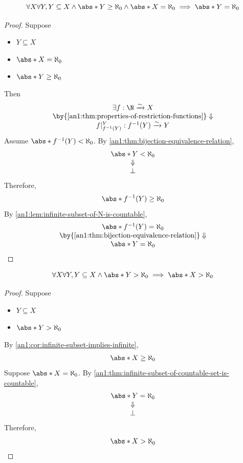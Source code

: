 \begin{theorem} \label{an1:thm:infinite-subset-of-countable-set-is-countable}
  \[
    \forall X \forall Y, Y \subseteq X \land \abs*{Y} \geq \aleph_{0} \land \abs*{X} = \aleph_{0}
    \implies \abs*{Y} = \aleph_{0}
  \]
\end{theorem}

\begin{proof}
  Suppose
  \begin{itemize}
    \item $Y \subseteq X$
    \item $\abs*{X} = \aleph_{0}$
    \item $\abs*{Y} \geq \aleph_{0}$
  \end{itemize}
  Then
  \[
    \begin{array}{c}
      \exists f: \N \xrightarrow{\sim} X                                 \\
      \by{\Cref{an1:thm:properties-of-restriction-functions}} \Downarrow \\
      f|_{f^{-1}(Y)}^{Y}: f^{-1}(Y) \xrightarrow{\sim} Y
    \end{array}
  \]
  Assume $\abs*{f^{-1}(Y)} < \aleph_{0}$. By \cref{an1:thm:bijection-equivalence-relation},
  \[
    \begin{array}{c}
      \abs*{Y} < \aleph_{0} \\
      \Downarrow            \\
      \bot
    \end{array}
  \]
  Therefore,
  \[
    \abs*{f^{-1}(Y)} \geq \aleph_{0}
  \]
  By \cref{an1:lem:infinite-subset-of-N-is-countable},
  \[
    \begin{array}{c}
      \abs*{f^{-1}(Y)} = \aleph_{0}                                 \\
      \by{\Cref{an1:thm:bijection-equivalence-relation}} \Downarrow \\
      \abs*{Y} = \aleph_{0}
    \end{array}
  \]
\end{proof}

\begin{corollary} \label{an1:cor:uncountable-subset-implies-uncountable}
  \[
    \forall X \forall Y, Y \subseteq X \land \abs*{Y} > \aleph_{0} \implies \abs*{X} > \aleph_{0}
  \]
\end{corollary}

\begin{proof}
  Suppose
  \begin{itemize}
    \item $Y \subseteq X$
    \item $\abs*{Y} > \aleph_{0}$
  \end{itemize}
  By \cref{an1:cor:infinite-subset-implies-infinite},
  \[
    \abs*{X} \geq \aleph_{0}
  \]
  Suppose $\abs*{X} = \aleph_{0}$. By \cref{an1:thm:infinite-subset-of-countable-set-is-countable},
  \[
    \begin{array}{c}
      \abs*{Y} = \aleph_{0} \\
      \Downarrow            \\
      \bot
    \end{array}
  \]
  Therefore,
  \[
    \abs*{X} > \aleph_{0}
  \]
\end{proof}

